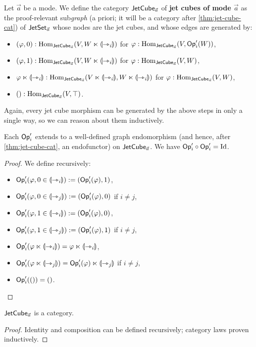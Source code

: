 \documentclass[a4paper]{article}
\begin{document}
\begin{definition} \label{def:jet-cube-cat}
	Let $\vec a$ be a mode.
	We define the category $\mathsf{JetCube}_{\vec a}$ of \textbf{jet cubes of mode $\vec a$} as the proof-relevant sub\emph{graph} (a priori; it will be a category after \cref{thm:jet-cube-cat}) of $\mathsf{JetSet}_{\vec a}$ whose nodes are the jet cubes, and whose edges are generated by:
	\begin{itemize}
		\item $(\varphi, 0) : {\mathrm{Hom}}_{\mathsf{JetCube}_{\vec a}}(V, W \ltimes {\llparenthesis \rightarrowtriangle_i \rrparenthesis})$ for $\varphi : {\mathrm{Hom}}_{\mathsf{JetCube}_{\vec a}}(V, {\mathsf{Op}}'_i(W))$,
		\item $(\varphi, 1) : {\mathrm{Hom}}_{\mathsf{JetCube}_{\vec a}}(V, W \ltimes {\llparenthesis \rightarrowtriangle_i \rrparenthesis})$ for $\varphi : {\mathrm{Hom}}_{\mathsf{JetCube}_{\vec a}}(V, W)$,
		\item $\varphi \ltimes {\llparenthesis \rightarrowtriangle_i \rrparenthesis} : {\mathrm{Hom}}_{\mathsf{JetCube}_{\vec a}}(V \ltimes {\llparenthesis \rightarrowtriangle_i \rrparenthesis}, W \ltimes {\llparenthesis \rightarrowtriangle_i \rrparenthesis})$ for $\varphi : {\mathrm{Hom}}_{\mathsf{JetCube}_{\vec a}}(V, W)$,
		\item $() : {\mathrm{Hom}}_{\mathsf{JetCube}_{\vec a}}(V, \top)$.
	\end{itemize}
\end{definition}
Again, every jet cube morphism can be generated by the above steps in only a single way, so we can reason about them inductively.
\begin{corollary} \label{thm:jet-cube-op-ftr}
	Each ${\mathsf{Op}}'_i$ extends to a well-defined graph endomorphism (and hence, after \cref{thm:jet-cube-cat}, an endofunctor) on $\mathsf{JetCube}_{\vec a}$.
	We have ${\mathsf{Op}}'_i \circ {\mathsf{Op}}'_i = \mathrm{Id}$.
\end{corollary}
\begin{proof}
	We define recursively:
	\begin{itemize}
		\item ${\mathsf{Op}}'_i(\varphi, 0 \in {\llparenthesis \rightarrowtriangle_i \rrparenthesis}) := ({\mathsf{Op}}'_i(\varphi), 1)$,
		\item ${\mathsf{Op}}'_i(\varphi, 0 \in {\llparenthesis \rightarrowtriangle_j \rrparenthesis}) := ({\mathsf{Op}}'_i(\varphi), 0)$ if $i \neq j$,
		\item ${\mathsf{Op}}'_i(\varphi, 1 \in {\llparenthesis \rightarrowtriangle_i \rrparenthesis}) := ({\mathsf{Op}}'_i(\varphi), 0)$,
		\item ${\mathsf{Op}}'_i(\varphi, 1 \in {\llparenthesis \rightarrowtriangle_j \rrparenthesis}) := ({\mathsf{Op}}'_i(\varphi), 1)$ if $i \neq j$,
		\item ${\mathsf{Op}}'_i(\varphi \ltimes {\llparenthesis \rightarrowtriangle_i \rrparenthesis}) = \varphi \ltimes {\llparenthesis \rightarrowtriangle_i \rrparenthesis}$,
		\item ${\mathsf{Op}}'_i(\varphi \ltimes {\llparenthesis \rightarrowtriangle_j \rrparenthesis}) = {\mathsf{Op}}'_i(\varphi) \ltimes {\llparenthesis \rightarrowtriangle_j \rrparenthesis}$ if $i \neq j$,
		\item ${\mathsf{Op}}'_i(()) = ()$. \qedhere
	\end{itemize}
\end{proof}
\begin{corollary} \label{thm:jet-cube-cat}
	$\mathsf{JetCube}_{\vec a}$ is a category.
\end{corollary}
\begin{proof}
	Identity and composition can be defined recursively; category laws proven inductively.
\end{proof}
\end{document}
